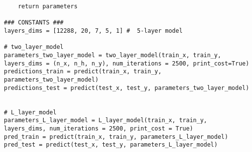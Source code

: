 \begin{verbatim}
    return parameters

### CONSTANTS ###
layers_dims = [12288, 20, 7, 5, 1] #  5-layer model

# two_layer_model
parameters_two_layer_model = two_layer_model(train_x, train_y, layers_dims = (n_x, n_h, n_y), num_iterations = 2500, print_cost=True)
predictions_train = predict(train_x, train_y, parameters_two_layer_model)
predictions_test = predict(test_x, test_y, parameters_two_layer_model)


# L_layer_model
parameters_L_layer_model = L_layer_model(train_x, train_y, layers_dims, num_iterations = 2500, print_cost = True)
pred_train = predict(train_x, train_y, parameters_L_layer_model)
pred_test = predict(test_x, test_y, parameters_L_layer_model)
\end{verbatim}
\clearpage